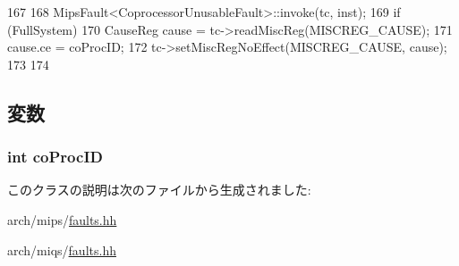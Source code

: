 \begin{DoxyCode}
167     {
168         MipsFault<CoprocessorUnusableFault>::invoke(tc, inst);
169         if (FullSystem) {
170             CauseReg cause = tc->readMiscReg(MISCREG_CAUSE);
171             cause.ce = coProcID;
172             tc->setMiscRegNoEffect(MISCREG_CAUSE, cause);
173         }
174     }
\end{DoxyCode}


\subsection{変数}
\hypertarget{classMipsISA_1_1CoprocessorUnusableFault_a29d755205150fee078e98a57e96d2ca1}{
\subsubsection[{coProcID}]{\setlength{\rightskip}{0pt plus 5cm}int {\bf coProcID}}}
\label{classMipsISA_1_1CoprocessorUnusableFault_a29d755205150fee078e98a57e96d2ca1}


このクラスの説明は次のファイルから生成されました:\begin{DoxyCompactItemize}
\item 
arch/mips/\hyperlink{arch_2mips_2faults_8hh}{faults.hh}\item 
arch/miqs/\hyperlink{arch_2miqs_2faults_8hh}{faults.hh}\end{DoxyCompactItemize}
